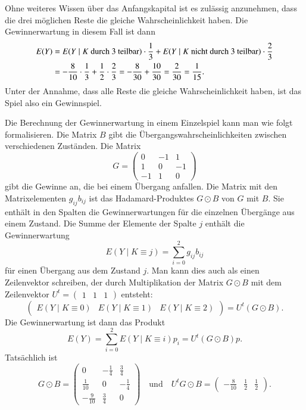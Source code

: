 Ohne weiteres Wissen über das Anfangskapital ist es zulässig anzunehmen,
dass die drei möglichen Reste die gleiche Wahrscheinlichkeit haben.
Die Gewinnerwartung in diesem Fall ist dann
\begin{align}
E(Y)
&=
E(Y\mid \text{$K$ durch $3$ teilbar}) \cdot \frac13
+
E(Y\mid\text{$K$ nicht durch $3$ teilbar}) \cdot \frac23
\notag
\\
&=
-\frac{8}{10}\cdot\frac{1}{3}
+
\frac{1}{2}\cdot\frac{2}{3}
=
-\frac{8}{30}+\frac{10}{30}
=
\frac{2}{30}
=
\frac{1}{15}.
\label{buch:wahrscheinlichkeit:eqn:Beinzelerwartung}
\end{align}
Unter der Annahme, dass alle Reste die gleiche Wahrscheinlichkeit haben,
ist das Spiel also ein Gewinnspiel.

Die Berechnung der Gewinnerwartung in einem Einzelspiel kann man 
wie folgt formalisieren.
Die Matrix $B$ gibt die Übergangswahrscheinlichkeiten zwischen
verschiedenen Zuständen.
Die Matrix 
\[
G=\begin{pmatrix}
 0&-1& 1\\
 1& 0&-1\\
-1& 1& 0
\end{pmatrix}
\]
gibt die Gewinne an, die bei einem Übergang anfallen.
Die Matrix mit den Matrixelementen $g_{ij}b_{ij}$ ist das Hadamard-Produktes 
$G\odot B$ von $G$ mit $B$.
Sie enthält in den Spalten die Gewinnerwartungen
für die einzelnen Übergänge aus einem Zustand.
Die Summe der Elemente der Spalte $j$ enthält die Gewinnerwartung
\[
E(Y\mid K\equiv j)
=
\sum_{i=0}^2 g_{ij}b_{ij}
\]
für einen Übergang aus dem Zustand $j$.
Man kann dies auch als einen Zeilenvektor schreiben, der durch Multiplikation
der Matrix $G\odot B$ mit dem Zeilenvektor
$U^t=\begin{pmatrix}1&1&1\end{pmatrix}$
entsteht:
\[
\begin{pmatrix}
E(Y\mid K\equiv 0)&
E(Y\mid K\equiv 1)&
E(Y\mid K\equiv 2)
\end{pmatrix}
=
U^t
(G\odot B).
\]
Die Gewinnerwartung ist dann das Produkt
\[
E(Y)
=
\sum_{i=0}^2
E(Y\mid K\equiv i) p_i
=
U^t
(G\odot B)p.
\]
Tatsächlich ist
\[
G\odot B
=
\begin{pmatrix}
 0          &-\frac14 & \frac34\\
 \frac1{10} & 0       &-\frac14\\
-\frac9{10} & \frac34 & 0
\end{pmatrix}
\quad\text{und}\quad
U^t G\odot B
=
\begin{pmatrix}-\frac{8}{10}&\frac12&\frac12\end{pmatrix}.
\]
